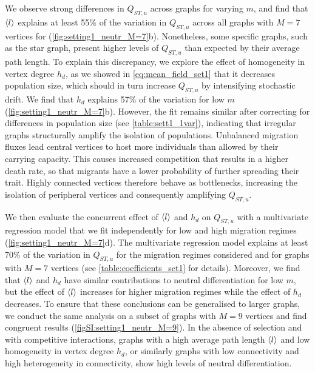   We observe strong differences in $Q_{ST,u}$ across graphs for varying $m$, and find that $\langle l \rangle$ explains at least 55\% of the variation in $Q_{ST,u}$ across all graphs with $M=7$ vertices for (\cref{fig:setting1_neutr_M=7}b). Nonetheless, some specific graphs, such as the star graph, present higher levels of $Q_{ST,u}$ than expected by their average path length. To explain this discrepancy, we explore the effect of homogeneity in vertex degree $h_d$, as we showed in \cref{eq:mean_field_set1} that it decreases population size, which should in turn increase $Q_{ST,u}$ by intensifying stochastic drift.
  We find that $h_d$ explains 57\% of the variation for low $m$ (\cref{fig:setting1_neutr_M=7}b). However, the fit remains similar after correcting for differences in population size (see \cref{table:sett1_1var}), indicating that irregular graphs structurally amplify the isolation of populations. Unbalanced migration fluxes lead central vertices to host more individuals than allowed by their carrying capacity. This causes increased competition that results in a higher death rate, so that migrants have a lower probability of further spreading their trait. Highly connected vertices therefore behave as bottlenecks, increasing the isolation of peripheral vertices and consequently amplifying $Q_{ST,u}$.
  
  We then evaluate the concurrent effect of $\langle l \rangle$ and $h_d$ on $Q_{ST,u}$ with a multivariate regression model that we fit independently for low and high migration regimes (\cref{fig:setting1_neutr_M=7}d).
  The multivariate regression model explains at least 70\% of the variation in $Q_{ST,u}$ for the migration regimes considered and for graphs with $M=7$ vertices (see \cref{table:coefficients_set1} for details). Moreover, we find that $\langle l \rangle$ and $h_d$ have similar contributions to neutral differentiation for low $m$, but the effect of $\langle l \rangle$ increases for higher migration regimes while the effect of $h_d$ decreases.
  To ensure that these conclusions can be generalised to larger graphs, we conduct the same analysis on a subset of graphs with $M=9$ vertices and find congruent results (\cref{figSI:setting1_neutr_M=9}).
  In the absence of selection and with competitive interactions, graphs with a high average path length $\langle l \rangle$ and low homogeneity in vertex degree $h_d$, or similarly graphs with low connectivity and high heterogeneity in connectivity, show high levels of neutral differentiation.
  
